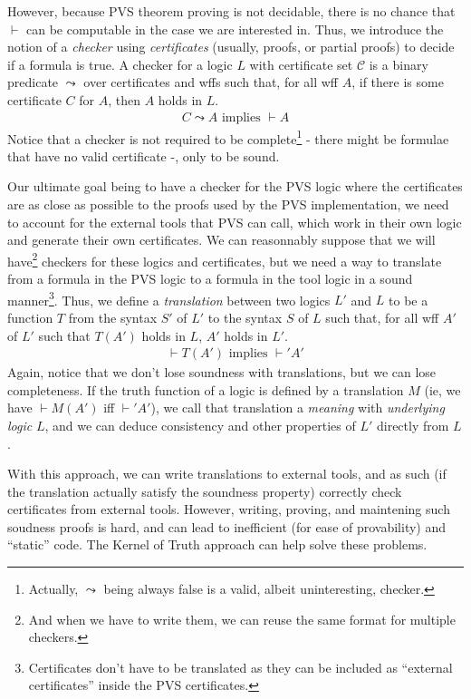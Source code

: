 \documentclass[utf8,a4paper]{article}
\begin{document}
However, because PVS theorem proving is not decidable, there is no
chance that $\vdash$ can be computable in the case we are interested
in. Thus, we introduce the notion of a \textit{checker} using
\textit{certificates} (usually, proofs, or partial proofs) to decide
if a formula is true. A checker for a logic $L$ with certificate set
$\mathcal{C}$ is a binary predicate $\leadsto$ over certificates and
wffs such that, for all wff $A$, if there is some certificate $C$ for
$A$, then $A$ holds in $L$.
\begin{align*}
  C \leadsto A \mbox{ implies } \vdash A
\end{align*}
Notice that a checker is not required to be
complete\footnote{Actually, $\leadsto$ being always false is a valid,
  albeit uninteresting, checker.} - there might be formulae that have
no valid certificate -, only to be sound.

Our ultimate goal being to have a checker for the PVS logic where the
certificates are as close as possible to the proofs used by the PVS
implementation, we need to account for the external tools that PVS can
call, which work in their own logic and generate their own
certificates. We can reasonnably suppose that we will
have\footnote{And when we have to write them, we can reuse the same
  format for multiple checkers.} checkers for these logics and
certificates, but we need a way to translate from a formula in the PVS
logic to a formula in the tool logic in a sound
manner\footnote{Certificates don't have to be translated as they can
  be included as ``external certificates'' inside the PVS
  certificates.}. Thus, we define a \textit{translation} between two
logics $L'$ and $L$ to be a function $T$ from the syntax $S'$ of $L'$
to the syntax $S$ of $L$ such that, for all wff $A'$ of $L'$ such that
$T(A')$ holds in $L$, $A'$ holds in $L'$.
\begin{align*}
  \vdash T(A') \mbox{ implies } \vdash' A'
\end{align*}
Again, notice that we don't lose soundness with translations, but we
can lose completeness. If the truth function of a logic is defined by
a translation $M$ (ie, we have $\vdash M(A')$ iff $\vdash' A'$), we
call that translation a \textit{meaning} with \textit{underlying
  logic} $L$, and we can deduce consistency and other properties of
$L'$ directly from $L$.

With this approach, we can write translations to external tools, and
as such (if the translation actually satisfy the soundness property)
correctly check certificates from external tools. However, writing,
proving, and maintening such soudness proofs is hard, and can lead to
inefficient (for ease of provability) and ``static'' code. The Kernel
of Truth approach can help solve these problems.
\end{document}
